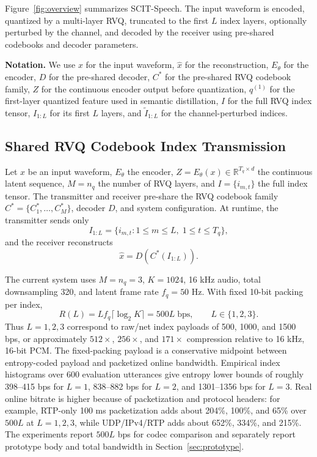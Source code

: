 \documentclass[10pt,twocolumn]{article}
\newcommand{\method}{SCIT-Speech}
\newcommand{\codebook}{C^\ast}
\newcommand{\rawrate}{R(L)}
\begin{document}
Figure~\ref{fig:overview} summarizes \method. The input waveform is encoded, quantized by a multi-layer RVQ, truncated to the first \(L\) index layers, optionally perturbed by the channel, and decoded by the receiver using pre-shared codebooks and decoder parameters.

\textbf{Notation.}
We use \(x\) for the input waveform, \(\hat{x}\) for the reconstruction, \(E_\theta\) for the encoder, \(D\) for the pre-shared decoder, \(\codebook\) for the pre-shared RVQ codebook family, \(Z\) for the continuous encoder output before quantization, \(q^{(1)}\) for the first-layer quantized feature used in semantic distillation, \(I\) for the full RVQ index tensor, \(I_{1:L}\) for its first \(L\) layers, and \(\tilde{I}_{1:L}\) for the channel-perturbed indices.

\subsection{Shared RVQ Codebook Index Transmission}

Let \(x\) be an input waveform, \(E_\theta\) the encoder, \(Z=E_\theta(x)\in\mathbb{R}^{T_q\times d}\) the continuous latent sequence, \(M=n_q\) the number of RVQ layers, and \(I=\{i_{m,t}\}\) the full index tensor. The transmitter and receiver pre-share the RVQ codebook family \(\codebook=\{C_1^\ast,\ldots,C_M^\ast\}\), decoder \(D\), and system configuration. At runtime, the transmitter sends only
\[
I_{1:L}=\{i_{m,t}:1\leq m\leq L,\;1\leq t\leq T_q\},
\]
and the receiver reconstructs
\[
\hat{x}=D(\codebook(I_{1:L})).
\]

The current system uses \(M=n_q=3\), \(K=1024\), 16 kHz audio, total downsampling 320, and latent frame rate \(f_q=50\) Hz. With fixed 10-bit packing per index,
\[
\rawrate = L f_q \lceil \log_2 K\rceil = 500L\;\text{bps}, \qquad L\in\{1,2,3\}.
\]
Thus \(L=1,2,3\) correspond to raw/net index payloads of 500, 1000, and 1500 bps, or approximately \(512\times\), \(256\times\), and \(171\times\) compression relative to 16 kHz, 16-bit PCM. The fixed-packing payload is a conservative midpoint between entropy-coded payload and packetized online bandwidth. Empirical index histograms over 600 evaluation utterances give entropy lower bounds of roughly 398--415 bps for \(L=1\), 838--882 bps for \(L=2\), and 1301--1356 bps for \(L=3\). Real online bitrate is higher because of packetization and protocol headers: for example, RTP-only 100 ms packetization adds about 204\%, 100\%, and 65\% over \(500L\) at \(L=1,2,3\), while UDP/IPv4/RTP adds about 652\%, 334\%, and 215\%. The experiments report \(500L\) bps for codec comparison and separately report prototype body and total bandwidth in Section~\ref{sec:prototype}.
\end{document}
